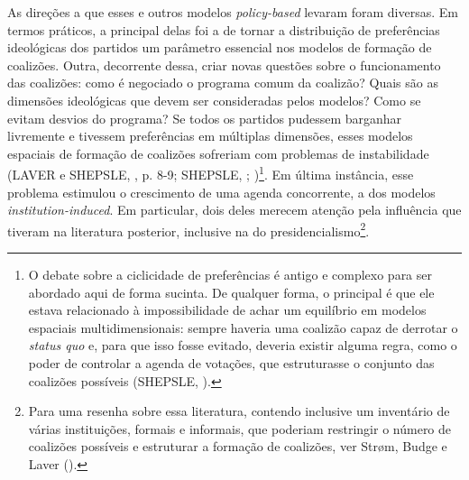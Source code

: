 As direções a que esses e outros modelos \textit{policy-based} levaram foram diversas. Em termos práticos, a principal delas foi a de tornar a distribuição de preferências ideológicas dos partidos um parâmetro essencial nos modelos de formação de coalizões. Outra, decorrente dessa, criar novas questões sobre o funcionamento das coalizões: como é negociado o programa comum da coalizão? Quais são as dimensões ideológicas que devem ser consideradas pelos modelos? Como se evitam desvios do programa? Se todos os partidos pudessem barganhar livremente e tivessem preferências em múltiplas dimensões, esses modelos espaciais de formação de coalizões sofreriam com problemas de instabilidade (LAVER e SHEPSLE, \citeyear{laver1996}, p. 8-9; SHEPSLE, \citeyear{shepsle1986}; \citeyear{strom1994})\footnote{O debate sobre a ciclicidade de preferências é antigo e complexo para ser abordado aqui de forma sucinta. De qualquer forma, o principal é que ele estava relacionado à impossibilidade de achar um equilíbrio em modelos espaciais multidimensionais: sempre haveria uma coalizão capaz de derrotar o \textit{status quo} e, para que isso fosse evitado, deveria existir alguma regra, como o poder de controlar a agenda de votações, que estruturasse o conjunto das coalizões possíveis (SHEPSLE, \citeyear{shepsle1986}).}. Em última instância, esse problema estimulou o crescimento de uma agenda concorrente, a dos modelos \textit{institution-induced}. Em particular, dois deles merecem atenção pela influência que tiveram na literatura posterior, inclusive na do presidencialismo\footnote{Para uma resenha sobre essa literatura, contendo inclusive um inventário de várias instituições, formais e informais, que poderiam restringir o número de coalizões possíveis e estruturar a formação de coalizões, ver Str\o{}m, Budge e Laver (\citeyear{strom1994}).}.

